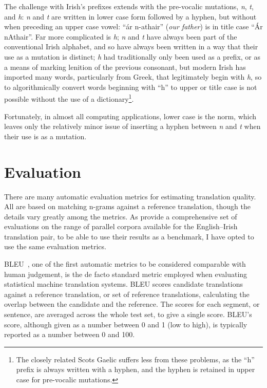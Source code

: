 The challenge with Irish's prefixes extends with the pre-vocalic mutations, \textit{n}, \textit{t}, and
\textit{h}: \textit{n} and \textit{t} are written in lower case form followed by a hyphen, but without 
when preceding an upper case vowel: ``\'ar n-athair'' (\textit{our father}) is in title case 
``\'Ar nAthair''. Far more complicated is \textit{h}; \textit{n} and \textit{t} have always been part of
the conventional Irish alphabet, and so have always been written in a way that their use as a mutation is
distinct; \textit{h} had traditionally only been used as a prefix, or as a means of marking lenition of the
previous consonant, but modern Irish has imported many words, particularly from Greek, that legitimately
begin with \textit{h}, so to algorithmically convert words beginning with ``h'' to upper or title case 
is not possible without the use of a dictionary\footnote{The closely related Scots Gaelic suffers less
from these problems, as the ``h'' prefix is always written with a hyphen, and the hyphen is retained in
upper case for pre-vocalic mutations.}.

Fortunately, in almost all computing applications, lower case is the norm, which leaves only the 
relatively minor issue of inserting a hyphen between \textit{n} and \textit{t} when their use is as a
mutation.



\section{Evaluation}
\label{sect:introeval}

There are many automatic evaluation metrics for estimating translation quality. All are based on
matching n-grams against a reference translation, though the details vary greatly among the metrics.
As \citet{ARCAN16.9} provide a comprehensive set of evaluations on the range of parallel corpora
available for the English--Irish translation pair, to be able to use their results as a benchmark, I
have opted to use the same evaluation metrics.

BLEU~\citep{Papineni02bleu}, one of the first automatic metrics to be considered comparable with
human judgement, is the de facto standard metric employed when evaluating statistical machine translation
systems. BLEU scores candidate translations against a reference translation, or set of reference
translations, calculating the overlap between the candidate and the reference. The scores for each
segment, or sentence, are averaged across the whole test set, to give a single score.
BLEU's score, although given as a number between 0 and 1 (low to high), is typically reported as a number
between 0 and 100.

